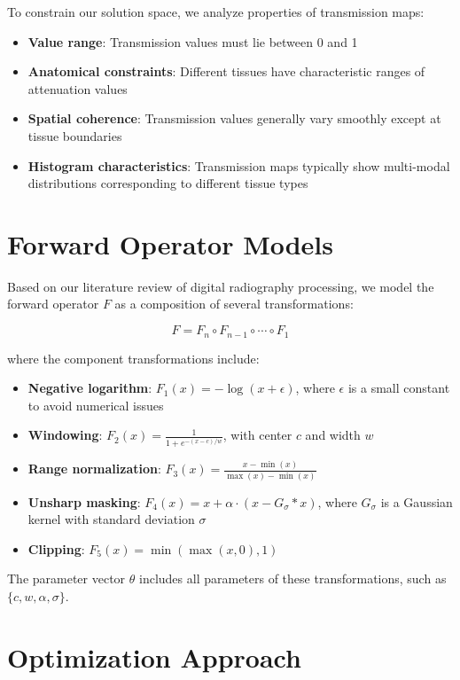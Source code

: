 \documentclass[nomenclature, english, bibtex]{kththesis}
\numberwithin{listing}{chapter}
\begin{document}
To constrain our solution space, we analyze properties of transmission maps:

\begin{itemize}
    \item \textbf{Value range}: Transmission values must lie between 0 and 1
    \item \textbf{Anatomical constraints}: Different tissues have characteristic ranges of attenuation values
    \item \textbf{Spatial coherence}: Transmission values generally vary smoothly except at tissue boundaries
    \item \textbf{Histogram characteristics}: Transmission maps typically show multi-modal distributions corresponding to different tissue types
\end{itemize}

\section{Forward Operator Models}
Based on our literature review of digital radiography processing, we model the forward operator $F$ as a composition of several transformations:

\begin{equation}
F = F_n \circ F_{n-1} \circ \cdots \circ F_1
\end{equation}

where the component transformations include:
\begin{itemize}
    \item \textbf{Negative logarithm}: $F_1(x) = -\log(x + \epsilon)$, where $\epsilon$ is a small constant to avoid numerical issues
    \item \textbf{Windowing}: $F_2(x) = \frac{1}{1+e^{-(x-c)/w}}$, with center $c$ and width $w$
    \item \textbf{Range normalization}: $F_3(x) = \frac{x - \min(x)}{\max(x) - \min(x)}$
    \item \textbf{Unsharp masking}: $F_4(x) = x + \alpha \cdot (x - G_\sigma * x)$, where $G_\sigma$ is a Gaussian kernel with standard deviation $\sigma$
    \item \textbf{Clipping}: $F_5(x) = \min(\max(x, 0), 1)$
\end{itemize}

The parameter vector $\theta$ includes all parameters of these transformations, such as $\{c, w, \alpha, \sigma\}$.

\section{Optimization Approach}
\end{document}
